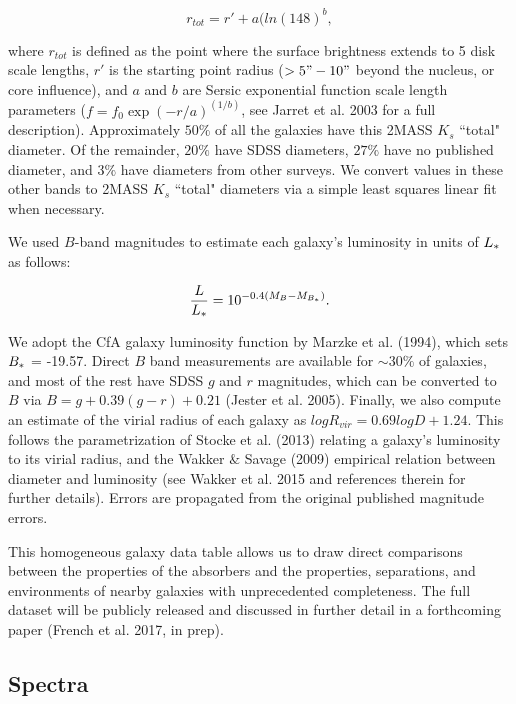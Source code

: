 \documentclass[iop]{emulateapj-rtx4}
\begin{document}
\begin{equation}
r_{tot} = r' + a(ln(148)^b,
\end{equation}

\noindent where $r_{tot}$ is defined as the point where the surface brightness extends to 5 disk scale lengths, $r'$ is the starting point radius ($>5" - 10"$ beyond the nucleus, or core influence), and $a$ and $b$ are Sersic exponential function scale length parameters ($f = f_0 \exp{(-r/a)}^{(1/b)}$, see Jarret et al. 2003 for a full description). Approximately $50\%$ of all the galaxies have this 2MASS $K_s$ ``total" diameter. Of the remainder, $20\%$ have SDSS diameters, $27\%$ have no published diameter, and $3\%$ have diameters from other surveys. We convert values in these other bands to 2MASS $K_s$ ``total" diameters via a simple least squares linear fit when necessary.

We used $B$-band magnitudes to estimate each galaxy's luminosity in units of $L_{\**}$ as follows:

\begin{equation}
	\frac{L}{L_{\**}} = 10^{-0.4 (M_{B} - M_{B_{\**}})}.
\end{equation}

We adopt the CfA galaxy luminosity function by Marzke et al. (1994), which sets $B_{\**} $ = -19.57. Direct $B$ band measurements are available for $\sim 30\%$ of galaxies, and most of the rest have SDSS $g$ and $r$ magnitudes, which can be converted to $B$ via $B = g + 0.39 (g-r) + 0.21$ (Jester et al. 2005). Finally, we also compute an estimate of the virial radius of each galaxy as $log R_{vir} = 0.69 log D + 1.24$. This follows the parametrization of Stocke et al. (2013) relating a galaxy's luminosity to its virial radius, and the Wakker $\&$ Savage (2009) empirical relation between diameter and luminosity (see Wakker et al. 2015 and references therein for further details). Errors are propagated from the original published magnitude errors.

This homogeneous galaxy data table allows us to draw direct comparisons between the properties of the absorbers and the properties, separations, and environments of nearby galaxies with unprecedented completeness. The full dataset will be publicly released and discussed in further detail in a forthcoming paper (French et al. 2017, in prep).


\subsection{Spectra}
\end{document}
